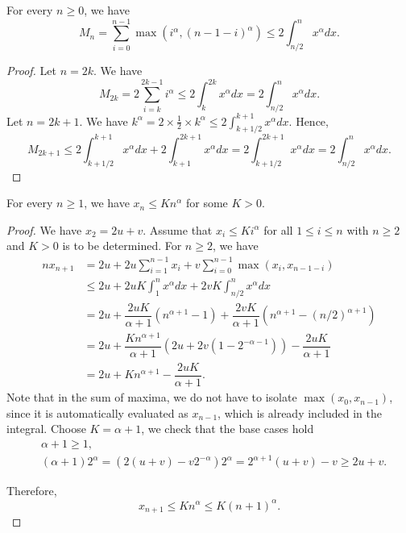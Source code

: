 \begin{lemma}
  For every $n\ge0$, we have
  $$M_n = \sum_{i=0}^{n-1} \max(i^\alpha, (n-1-i)^\alpha) \le 2\int_{n/2}^n x^\alpha dx.$$
\end{lemma}

\begin{proof}
  Let $n=2k$. We have
  $$M_{2k} = 2 \sum_{i=k}^{2k-1} i^\alpha \le 2 \int_k^{2k} x^\alpha dx = 2 \int_{n/2}^n x^\alpha dx.$$
  Let $n=2k+1$. We have $k^\alpha = 2 \times \frac{1}{2} \times k^\alpha \le 2 \int_{k+1/2}^{k+1} x^\alpha dx$. Hence,
  $$M_{2k+1} \le 2 \int_{k+1/2}^{k+1} x^\alpha dx + 2 \int_{k+1}^{2k+1} x^\alpha dx = 2 \int_{k+1/2}^{2k+1} x^\alpha dx = 2 \int_{n/2}^n x^\alpha dx.$$
\end{proof}

\begin{lemma}
  For every $n\ge1$, we have $x_n \le Kn^\alpha$ for some $K>0$.
\end{lemma}
\begin{proof}
  We have $x_2=2u+v$. Assume that $x_i \le Ki^\alpha$ for all $1\le i \le n$ with $n\ge 2$ and $K>0$ is to be determined. For $n\ge 2$, we have
  \begin{align*}
    nx_{n+1}
     & = 2u + 2u\sum_{i=1}^{n-1}x_i + v\sum_{i=0}^{n-1}\max(x_i, x_{n-1-i})                                                        \\
     & \le 2u + 2uK\int_{1}^{n}x^\alpha dx + 2vK\int_{n/2}^{n}x^\alpha dx                                                          \\
     & = 2u + \dfrac{2uK}{\alpha+1}\left(n^{\alpha+1}-1\right) + \dfrac{2vK}{\alpha+1}\left(n^{\alpha+1} - (n/2)^{\alpha+1}\right) \\
     & = 2u + \dfrac{K n^{\alpha+1}}{\alpha+1}\left(2u + 2v\left(1 - 2^{-\alpha-1}\right)\right)-\dfrac{2uK}{\alpha+1}             \\
     & = 2u + K n^{\alpha+1} -\dfrac{2uK}{\alpha+1}.
  \end{align*}
  Note that in the sum of maxima, we do not have to isolate $\max(x_0, x_{n-1})$, since it is automatically evaluated as $x_{n-1}$, which is already included in the integral. Choose $K=\alpha+1$, we check that the base cases hold
  \begin{align*}
     & \alpha + 1 \ge 1,                                                                             \\
     & (\alpha+1)2^\alpha = \left(2(u+v)-v2^{-\alpha}\right)2^\alpha = 2^{\alpha+1}(u+v)-v \ge 2u+v.
  \end{align*}

  Therefore,
  $$x_{n+1} \le Kn^\alpha \le K(n+1)^\alpha.$$
\end{proof}

